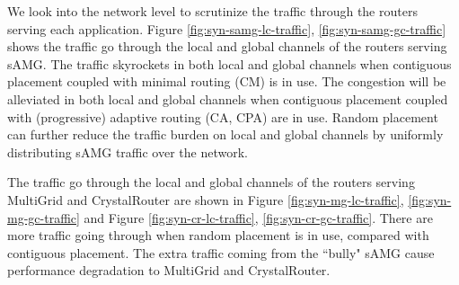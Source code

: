 \documentclass[conference,compsoc]{IEEEtran}
\begin{document}
We look into the network level to scrutinize the traffic through the routers serving each application. Figure \ref{fig:syn-samg-lc-traffic}, \ref{fig:syn-samg-gc-traffic} shows the traffic go through the local and global channels of the routers serving sAMG. The traffic skyrockets in both local and global channels when contiguous placement coupled with minimal routing (CM) is in use. The congestion will be alleviated in both local and global channels when contiguous placement coupled with (progressive) adaptive routing (CA, CPA) are in use. Random placement can further reduce the traffic burden on local and global channels by uniformly distributing sAMG traffic over the network. 

The traffic go through the local and global channels of the routers serving MultiGrid and CrystalRouter are shown in Figure \ref{fig:syn-mg-lc-traffic}, \ref{fig:syn-mg-gc-traffic} and Figure \ref{fig:syn-cr-lc-traffic}, \ref{fig:syn-cr-gc-traffic}. There are more traffic going through when random placement is in use, compared with contiguous placement. The extra traffic coming from the ``bully" sAMG cause performance degradation to MultiGrid and CrystalRouter. 
\end{document}
